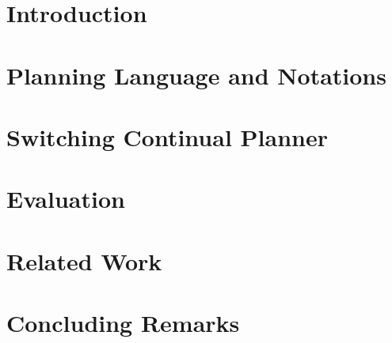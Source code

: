 \documentclass{article}
\begin{document}
\section{Introduction}



\section{Planning Language and Notations}


\section{Switching Continual Planner}


\vspace{-.5cm}
\section{Evaluation}



\vspace{-.2cm}
\section{Related Work}




\vspace{-.2cm}
\section{Concluding Remarks}





\end{document}
